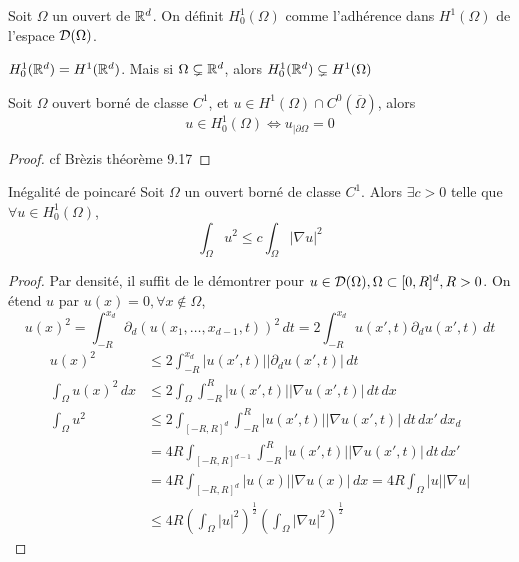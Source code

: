 \documentclass[]{report}
\begin{document}
    \begin{df}{}{}
        Soit $\Omega$ un ouvert de $\mathbb{R}^d$. On définit $H_0^1(\Omega)$ comme l'adhérence dans $H^1(\Omega)$ de l'espace $\mathcal{D}(\Omega)$.
    \end{df}

    \begin{re}{}{}
        $H_0^1(\mathbb{R}^d)=H^1(\mathbb{R}^d)$. Mais si $\Omega\subsetneq \mathbb{R}^d$, alors $H_0^1(\mathbb{R}^d)\subsetneq H^1(\Omega)$\\
    \end{re}

    \begin{prop}{}{}
        Soit $\Omega$ ouvert borné de classe $C^1$, et $u\in H^1(\Omega)\cap C^0(\overline{\Omega})$, alors
        \[u\in H_0^1(\Omega)\iff u_{|\partial \Omega}=0\]
    \end{prop}

    \begin{proof}
        cf Brèzis théorème 9.17
    \end{proof}

    \begin{tm}{Inégalité de poincaré}{}
        Soit $\Omega$ un ouvert borné de classe $C^1$. Alors $\exists c>0$ telle que $\forall u\in H_0^1(\Omega)$, 
        \[\int_{\Omega}u^2\le c\int_{\Omega}|\nabla u|^2\]
    \end{tm}

    \begin{proof}
        Par densité, il suffit de le démontrer pour $u\in \mathcal{D}(\Omega), \Omega\subset [0,R]^d,R>0$. On étend $u$ par $u(x)=0,\forall x\notin \Omega$,
        \[u(x)^2=\int_{-R}^{x_d}\partial_d (u(x_1,\ldots,x_{d-1},t))^2\, dt=2\int_{-R}^{x_d}u(x',t)\partial_d u(x',t)\, dt\]
        \begin{align*}
            u(x)^2&\le 2\int_{-R}^{x_d} |u(x',t)||\partial_d u(x',t)|\, dt\\
            \int_\Omega u(x)^2\, dx &\le 2\int_\Omega\int_{-R}^{R}|u(x',t)||\nabla u(x',t)|\, dt\, dx\\
            \int_\Omega u^2&\le 2\int_{[-R,R]^d}\int_{-R}^{R}|u(x',t)||\nabla u(x',t)|\, dt\, dx'\, dx_d\\
            &=4R \int_{[-R,R]^{d-1}}\int_{-R}^{R}|u(x',t)||\nabla u(x',t)|\, dt\, dx'\\
            &=4R \int_{[-R,R]^d}|u(x)||\nabla u(x)|\, dx=4R\int_{\Omega}|u||\nabla u|\\
            &\le 4R \left( \int_{\Omega}|u|^2\right)^{\frac{1}{2}} \left(\int_{\Omega}|\nabla u|^2\right)^{\frac{1}{2}}
        \end{align*}
    \end{proof}
    
\end{document}

